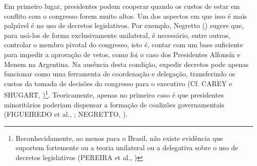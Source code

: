 Em primeiro lugar, presidentes podem cooperar quando os custos de estar em conflito com o congresso forem muito altos. Um dos aspectos em que isso é mais palpável é no uso de decretos legislativos. Por exemplo, Negretto (\citeyear{negretto2004}) sugere que, para usá-los de forma exclusivamente unilateral, é necessário, entre outros, controlar o membro pivotal do congresso, isto é, contar com um base suficiente para impedir a aprovação de vetos, como foi o caso dos Presidentes Alfonsín e Menem na Argentina. Na ausência desta condição, expedir decretos pode apenas funcionar como uma ferramenta de coordenação e delegação, transferindo os custos da tomada de decisões do congresso para o executivo (Cf. CAREY e SHUGART, \citeyear{carey1998})\footnote{Reconhecidamente, ao menos para o Brasil, não existe evidência que suportem fortemente ou a teoria unilateral ou a delegativa sobre o uso de decretos legislativos (PEREIRA et al., \citeyear{pereira2005})}. Teoricamente, apenas no primeiro caso é que presidentes minoritários poderiam dispensar a formação de coalizões governamentais (FIGUEIREDO et al., \citeyear{figueiredo2012}; NEGRETTO, \citeyear{negretto2006}).

